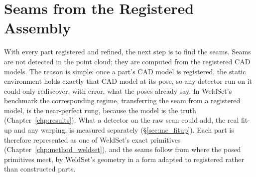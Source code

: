 \section{Seams from the Registered Assembly}
\label{sec:mc_seams}
With every part registered and refined, the next step is to find the seams. Seams are not detected
in the point cloud; they are computed from the registered CAD models. The reason is simple: once a
part's CAD model is registered, the static environment holds exactly that CAD model at its pose, so
any detector run on it could only rediscover, with error, what the poses already say. In WeldSet's
benchmark the corresponding regime, transferring the seam from a registered model, is the near-perfect
rung, because the model is the truth (Chapter~\ref{chp:results}). What a detector on the raw scan
could add, the real fit-up and any warping, is measured separately (\S\ref{sec:mc_fitup}). Each part
is therefore represented as one of WeldSet's exact primitives (Chapter~\ref{chp:method_weldset}), and
the seams follow from where the posed primitives meet, by WeldSet's geometry in a form adapted to
registered rather than constructed parts.

